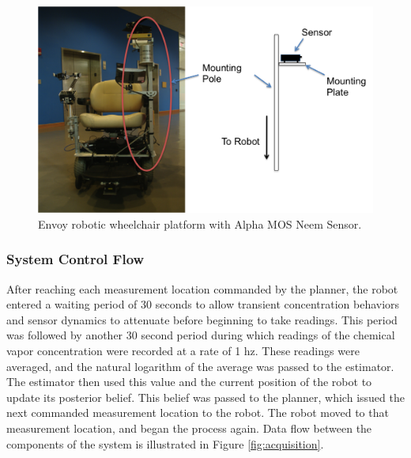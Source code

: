 \documentclass[submit, 12pt]{aiaa-pretty-modified}
\begin{document}
\begin{figure}
\begin{center}
\includegraphics[width=5in]{img/wheelchair.pdf}
\caption{Envoy robotic wheelchair platform with Alpha MOS Neem Sensor.}
\label{fig:wheelchair}
\end{center}
\end{figure}

\FloatBarrier

\label{sec:mount}

\subsubsection{System Control Flow}

After reaching each measurement location commanded by the planner,
the robot entered a waiting period of 30 seconds to allow transient
concentration behaviors and sensor dynamics to attenuate before
beginning to take readings.  This period was followed by another 30
second period during which readings of the chemical vapor
concentration were recorded at a rate of 1 hz.  These readings were
averaged, and the natural logarithm of the average was passed to the
estimator.  The estimator then used this value and the current
position of the robot to update its posterior belief.  This belief was
passed to the planner, which issued the next commanded
measurement location to the robot.  The robot moved to that measurement
location, and began the process again.  Data flow between the components of the system is illustrated in
Figure \ref{fig:acquisition}.
\end{document}
